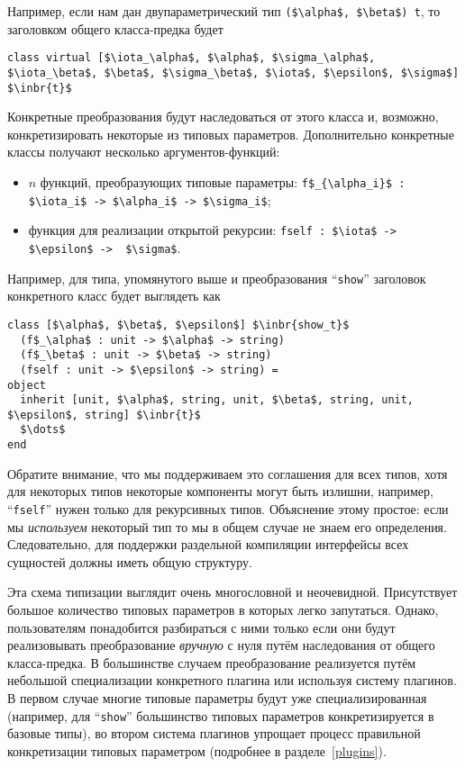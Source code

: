 Например, если нам дан двупараметрический тип \lstinline{($\alpha$, $\beta$) t}, то заголовком общего класса-предка будет 

\begin{lstlisting}
class virtual [$\iota_\alpha$, $\alpha$, $\sigma_\alpha$, $\iota_\beta$, $\beta$, $\sigma_\beta$, $\iota$, $\epsilon$, $\sigma$] $\inbr{t}$
\end{lstlisting}

Конкретные преобразования будут наследоваться от этого класса и, возможно, конкретизировать некоторые из типовых параметров.
Дополнительно конкретные классы получают несколько аргументов-функций:

\begin{itemize}
\item $n$ функций, преобразующих типовые параметры: \lstinline|f$_{\alpha_i}$ : $\iota_i$ -> $\alpha_i$ -> $\sigma_i$|;
\item функция для реализации открытой рекурсии: \lstinline|fself : $\iota$ -> $\epsilon$ ->  $\sigma$|.
\end{itemize}

Например, для типа, упомянутого выше и преобразования ``\lstinline{show}'' заголовок конкретного класс будет выглядеть как

\begin{lstlisting}
class [$\alpha$, $\beta$, $\epsilon$] $\inbr{show_t}$ 
  (f$_\alpha$ : unit -> $\alpha$ -> string)
  (f$_\beta$ : unit -> $\beta$ -> string)
  (fself : unit -> $\epsilon$ -> string) =
object 
  inherit [unit, $\alpha$, string, unit, $\beta$, string, unit, $\epsilon$, string] $\inbr{t}$
  $\dots$
end 
\end{lstlisting}

Обратите внимание, что мы поддерживаем это соглашения для всех типов, хотя для некоторых типов некоторые компоненты могут быть излишни, например, ``\lstinline{fself}''
нужен только для рекурсивных типов. Объяснение этому простое: если мы \emph{используем} некоторый тип
то мы в общем случае не знаем его определения. Следовательно, для поддержки раздельной компиляции интерфейсы всех сущностей должны иметь общую структуру.

Эта схема типизации выглядит очень многословной и неочевидной. Присутствует большое количество типовых параметров в которых легко запутаться.
Однако, пользователям понадобится разбираться с ними только если они будут реализовывать преобразование \emph{вручную} с нуля путём 
наследования от общего класса-предка.
В большинстве случаем преобразование реализуется путём небольшой специализации конкретного плагина или используя систему плагинов. 
В первом случае многие типовые параметры будут уже специализированная (например, для  ``\lstinline{show}'' большинство типовых параметров конкретизируется в базовые типы), во втором система плагинов упрощает процесс правильной конкретизации типовых параметром (подробнее в 
разделе~\ref{plugins}).

